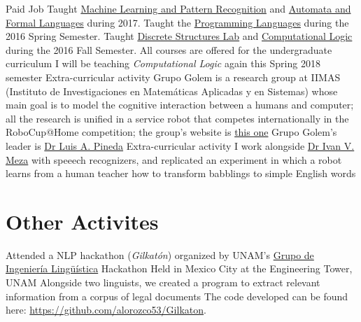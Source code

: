 \documentclass[11pt,a4paper,sans]{moderncv} %
\begin{document}
        {Paid Job}
        {Taught \href{http://turing.iimas.unam.mx/~ivanvladimir/page/curso_rpyaa}{Machine Learning and Pattern Recognition} and \href{https://sites.google.com/site/automataslengformales20172/}{Automata and Formal Languages} during 2017. Taught the \href{https://sites.google.com/site/lengprog20162/}{Programming Languages} during the 2016 Spring Semester. Taught \href{https://sites.google.com/a/ciencias.unam.mx/estructuras-discretas/home}{Discrete Structures Lab} and \href{https://sites.google.com/site/logcompunam20171/home}{Computational Logic} during the 2016 Fall Semester. All courses are offered for the undergraduate curriculum}
        {I will be teaching \emph{Computational Logic} again this Spring 2018 semester}{}{}
        {Extra-curricular activity}
        {Grupo Golem is a research group at IIMAS (Instituto de Investigaciones en Matem\'{a}ticas Aplicadas y en Sistemas) whose main goal is to model the cognitive interaction between a humans and computer; all the research is unified in a service robot that competes internationally in the RoboCup@Home competition; the group's website is \href{http://golem.iimas.unam.mx/home.php?lang=en&sec=home}{this one}}
        {Grupo Golem's leader is \href{http://turing.iimas.unam.mx/~luis/}{Dr Luis A. Pineda}}{}{}
        {Extra-curricular activity}
        {I work alongside \href{http://turing.iimas.unam.mx/~ivanvladimir/}{Dr Ivan V. Meza} with speeech recognizers, and replicated an experiment in which a robot learns from a human teacher how to transform babblings to simple English words}
        {}{}{}


\section{Other Activites}

        {Attended a NLP hackathon (\emph{Gilkatón}) organized by UNAM's
          \href{http://grupos.iingen.unam.mx/iling/es-mx/Paginas/default.aspx}{Grupo de Ingeniería Lingüística}}
        {Hackathon}
        {Held in Mexico City at the Engineering Tower, UNAM}
        {Alongside two linguists, we created a program to extract relevant information
          from a corpus of legal documents}
        {The code developed can be found here: \url{https://github.com/alorozco53/Gilkaton}.}
\end{document}
